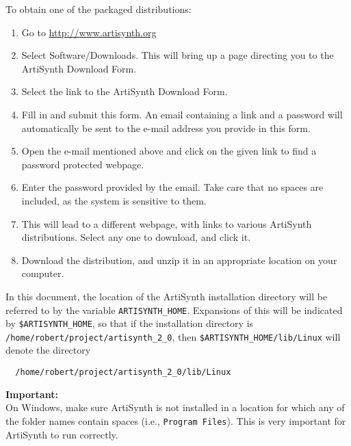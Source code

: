 \documentclass{article}
\begin{document}
To obtain one of the packaged distributions:

\begin{enumerate}

\item Go to \href{http://www.artisynth.org}{http://www.artisynth.org}

\item Select {\sf Software/Downloads}. This will bring up a page directing you 
to the {\sf ArtiSynth Download Form}.

\item Select the link to the {\sf ArtiSynth Download Form}.

\item Fill in and submit this form. An email containing a link and a password 
will automatically be sent to the e-mail address you provide in this form.

\item Open the e-mail mentioned above and click on the given link to find a 
password protected webpage.

\item Enter the password provided by the email. Take care that no spaces are 
included, as the system is sensitive to them.

\item This will lead to a different webpage, with links to various ArtiSynth 
distributions. Select any one to download, and click it.

\item Download the distribution, and unzip it in an appropriate
location on your computer.

\end{enumerate}

In this document, the location of the ArtiSynth installation directory
will be referred to by the variable {\tt ARTISYNTH\_HOME}.  Expansions
of this will be indicated by {\tt \$ARTISYNTH\_HOME}, so that if the
installation directory is {\tt /home/robert/project/artisynth\_2\_0},
then {\tt \$ARTISYNTH\_HOME/lib/Linux} will denote the directory
\begin{verbatim}
  /home/robert/project/artisynth_2_0/lib/Linux
\end{verbatim}

\begin{sideblock}
{\bf Important:}\\
On Windows, make sure ArtiSynth is not installed in a location
for which any of the folder names contain spaces
(i.e., {\tt Program Files}).
This is very important for ArtiSynth to run correctly.
\end{sideblock}
\end{document}
